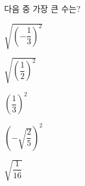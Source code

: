 다음 중 가장 큰 수는?
\begin{choices32}{\rule[-3ex]{0pt}{8ex}$\sqrt{\left(-\dfrac{1}{3}\right)^2}$}{\rule[-3ex]{0pt}{8ex}$\sqrt{\left(\dfrac{1}{2}\right)^2}$}{\rule[-3ex]{0pt}{8ex}$\left(\dfrac{1}{3}\right)^2$}{\rule[-3ex]{0pt}{8ex}$\left(-\sqrt{\dfrac{2}{5}}\right)^2$}{\rule[-3ex]{0pt}{8ex}$\sqrt{\dfrac{1}{16}}$}\end{choices32}

